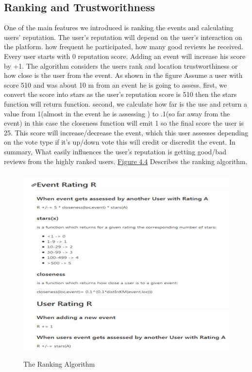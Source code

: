 \subsection{Ranking and Trustworithness} 

One of the main features we introduced is ranking the events and calculating users' reputation.
The user's reputation will depend on the user's interaction on the platform. how frequent he participated, how many good reviews he received. 
Every user starts with 0 reputation score. Adding an event will increase his score by +1. 
The algorithm considers the users rank and location trustworthiness or how close is the user from the event.
As shown in the figure  
Assume a user with score 510 and was about 10 m from an event he is going to assess. first, we convert the score into stars as the user's reputation score is 510 then the stars function will return function. second, we calculate how far is the use and return a value from 1(almost in the event he is assessing ) to .1(so far away from the event) in this case the closeness function will emit 1 so the final score the user is 25. This score will increase/decrease the event, which this user assesses depending on the vote type if it's up/down vote this will credit or discredit the event. 
In summary, What easily influences the user’s reputation is getting good/bad reviews from the highly ranked users. 
\hyperref[fig:mainactivityflow]{Figure 4.4} Describes the ranking algorithm. 
 \begin{figure}[H]
\center
\includegraphics[width=12cm,height=10cm]{images/ranking.png}
\caption{The Ranking Algorithm}
\label{fig:ranking}
\end{figure}
 
 






 



 
  